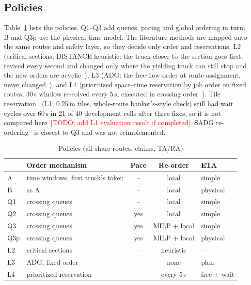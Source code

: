 \documentclass[conference]{IEEEtran}
\newcommand{\todo}[1]{\textcolor{red}{[TODO: #1]}}
\newcommand{\Qone}{Q1}
\newcommand{\Qtwo}{Q2}
\newcommand{\Qthree}{Q3}
\newcommand{\Qthreep}{Q3p}
\begin{document}
\subsection{Policies}
Table~\ref{tab:variants} lists the policies. \Qone--\Qthree{} add queues,
pacing and global ordering in turn; B and \Qthreep{} use the physical time
model. The literature methods are mapped onto the same routes and safety
layer, so they decide only order and reservations: L2 (critical sections,
DISTANCE heuristic: the truck closer to the section goes first, revised every
second and changed only where the yielding truck can still stop and the new
orders are acyclic~\cite{pecora2018,mannucci2021}), L3 (ADG: the free-flow
order at route assignment, never changed~\cite{honig2019}), and L4 (prioritized
space--time reservation by job order on fixed routes, 30\,s window re-solved
every 5\,s, executed in crossing order~\cite{li2021rhcr,varambally2022,cap2015}).
Tile reservation~\cite{fransen2022} (L1; 0.25\,m tiles, whole-route
banker's-style check) still had wait cycles over 60\,s in 21 of 40
development cells after three fixes, so it is not compared
here~\todo{add L1 evaluation result if completed}. SADG
re-ordering~\cite{berndt2024} is closest to \Qthree{} and was not
reimplemented.

\begin{table}[t]
\centering
\caption{Policies (all share routes, claims, TA/RA)}
\label{tab:variants}
\footnotesize
\setlength{\tabcolsep}{3pt}
\begin{tabular}{llccl}
\toprule
& Order mechanism & Pace & Re-order & ETA \\
\midrule
A    & time windows, first truck's token & -- & local & simple \\
B    & as A & -- & local & physical \\
\Qone  & crossing queues & -- & local & simple \\
\Qtwo  & crossing queues & yes & local & simple \\
\Qthree  & crossing queues & yes & MILP + local & simple \\
\Qthreep & crossing queues & yes & MILP + local & physical \\
\midrule
L2 & critical sections~\cite{pecora2018,mannucci2021} & -- & heuristic & -- \\
L3 & ADG, fixed order~\cite{honig2019} & -- & none & plan \\
L4 & prioritized reservation~\cite{li2021rhcr,cap2015} & -- & every 5\,s & free + wait \\
\bottomrule
\end{tabular}
\end{table}
\end{document}
